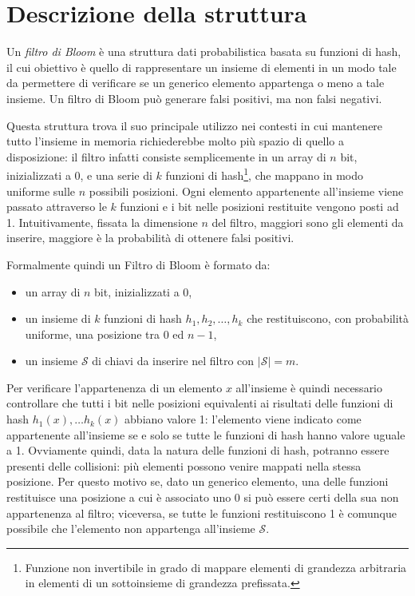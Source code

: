 \documentclass[../../main.tex]{subfiles}
\begin{document}
\section{Descrizione della struttura}
\label{sec:BFStruttura}
Un \textit{filtro di Bloom} \cite{Bloom1970SpacetimeTI} è una struttura dati probabilistica basata su funzioni di hash, il cui obiettivo è quello di rappresentare un insieme di elementi in un modo tale da permettere di verificare se un generico elemento appartenga o meno a tale insieme. Un filtro di Bloom può generare falsi positivi, ma non falsi negativi.

Questa struttura trova il suo principale utilizzo nei contesti in cui mantenere tutto l'insieme in memoria richiederebbe molto più spazio di quello a disposizione: il filtro infatti consiste semplicemente in un array di $n$ bit, inizializzati a $0$, e una serie di $k$ funzioni di hash\footnote{Funzione non invertibile in grado di mappare elementi di grandezza arbitraria in elementi di un sottoinsieme di grandezza prefissata.}, che mappano in modo uniforme sulle $n$ possibili posizioni. Ogni elemento appartenente all'insieme viene passato attraverso le $k$ funzioni e i bit nelle posizioni restituite vengono posti ad 1. Intuitivamente, fissata la dimensione $n$ del filtro, maggiori sono gli elementi da inserire, maggiore è la probabilità di ottenere falsi positivi.

Formalmente quindi un Filtro di Bloom è formato da:
    \begin{itemize}
        \item un array di $n$ bit, inizializzati a 0,
        \item un insieme di $k$ funzioni di hash $h_1, h_2, \dots, h_k$ che restituiscono, con probabilità uniforme, una posizione tra $0$ ed $n-1$,
        \item un insieme $\mathcal{S}$ di chiavi da inserire nel filtro con $|\mathcal{S}| = m$.
    \end{itemize}
Per verificare l'appartenenza di un elemento $x$ all'insieme è quindi necessario controllare che tutti i bit nelle posizioni equivalenti ai risultati delle funzioni di hash $h_1(x), \dots h_k(x)$ abbiano valore 1: l'elemento viene indicato come appartenente all'insieme se e solo se tutte le funzioni di hash hanno valore uguale a 1. Ovviamente quindi, data la natura delle funzioni di hash, potranno essere presenti delle collisioni: più elementi possono venire mappati nella stessa posizione. Per questo motivo se, dato un generico elemento, una delle funzioni restituisce una posizione a cui è associato uno 0 si può essere certi della sua non appartenenza al filtro; viceversa, se tutte le funzioni restituiscono 1 è comunque possibile che l'elemento non appartenga all'insieme $\mathcal{S}$.
\end{document}
